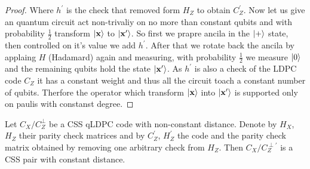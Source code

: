 \documentclass[manuscript,screen,review]{acmart}
\begin{document}
\begin{proof}
Where $h^{\prime}$ is the check that removed form $H_{Z}$ to obtain $C_{Z}^{\prime}$. Now let us give an quantum circuit act non-trivaliy on no more than constant qubits and with probability $\frac{1}{2}$ transform $\ket{\mathbf{x}}$ to $ \ket{\mathbf{x}^{\prime}}$. So first we prapre ancila in the $\ket{+}$ state, then controlled on it's value we add $h^{\prime}$. After that we rotate back the ancila by applaing $H$ (Hadamard) again and measuring, with probability $\frac{1}{2}$ we measure $\ket{0}$ and the remaining qubits hold the state $\ket{\mathbf{x}^{\prime}}$. As $h^{\prime}$ is also a check of the LDPC code $C_{Z}$ it has a constant weight and thus all the circuit toach a constant number of qubits. Therfore the operator which transform $\ket{\mathbf{x}}$ into $\ket{\mathbf{x}^{\prime}}$ is supported only on paulis with constanst degree.     
  \end{proof}


  \begin{claim}
Let $C_X/C_Z^{\perp}$ be a CSS qLDPC code with non-constant distance. Denote by $H_X$, $H_Z$ their parity check matrices and by $C_Z^{\prime}$, $H_Z^{\prime}$ the code and the parity check matrix obtained by removing one arbitrary check from $H_Z$. Then $C_X/C_Z^{\perp \prime}$ is a CSS pair with constant distance.
\end{claim}
\end{document}
